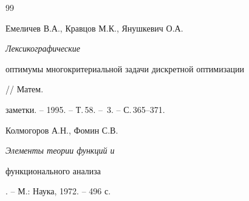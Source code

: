 \begin{thebibliography}{99}


Емеличев В.А., Кравцов М.К., Янушкевич О.А. {\em Лексикографические 


оптимумы многокритериальной задачи дискретной оптимизации} // Матем. 


заметки. -- 1995. -- Т.\,58. -- \No\,3. -- С.\,365--371. 




Колмогоров А.Н., Фомин С.В. {\em Элементы теории функций и 


функционального анализа}. -- М.: Наука, 1972. -- 496 с. 


 


\end{thebibliography} 


 


\vskip 2cm 


 






 


\label{end} 


 


